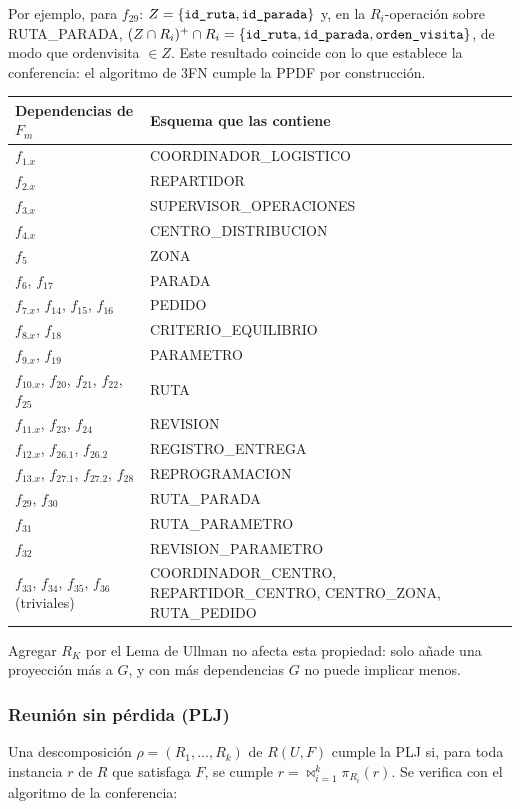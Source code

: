 \documentclass[11pt,a4paper]{article}
\newcommand{\ubrk}{\textunderscore\allowbreak}
\newcommand{\campo}[1]{\textnormal{\ttfamily\let\_\ubrk #1}}
\begin{document}
Por ejemplo, para $f_{29}$: $Z = \{\campo{id\_ruta}, \campo{id\_parada}\}$ y, en la $R_i$-operación sobre RUTA\_PARADA, $(Z \cap R_i)^+ \cap R_i = \{\campo{id\_ruta}, \campo{id\_parada}, \campo{orden\_visita}\}$, de modo que \campo{orden\_visita} $\in Z$. Este resultado coincide con lo que establece la conferencia: el algoritmo de 3FN cumple la PPDF por construcción.

{\small
\begin{longtable}{P{0.45\textwidth}P{0.45\textwidth}}
\toprule
\textbf{Dependencias de $F_m$} & \textbf{Esquema que las contiene}\\ \midrule
\endhead
$f_{1.x}$ & COORDINADOR\_LOGISTICO\\
$f_{2.x}$ & REPARTIDOR\\
$f_{3.x}$ & SUPERVISOR\_OPERACIONES\\
$f_{4.x}$ & CENTRO\_DISTRIBUCION\\
$f_5$ & ZONA\\
$f_6$, $f_{17}$ & PARADA\\
$f_{7.x}$, $f_{14}$, $f_{15}$, $f_{16}$ & PEDIDO\\
$f_{8.x}$, $f_{18}$ & CRITERIO\_EQUILIBRIO\\
$f_{9.x}$, $f_{19}$ & PARAMETRO\\
$f_{10.x}$, $f_{20}$, $f_{21}$, $f_{22}$, $f_{25}$ & RUTA\\
$f_{11.x}$, $f_{23}$, $f_{24}$ & REVISION\\
$f_{12.x}$, $f_{26.1}$, $f_{26.2}$ & REGISTRO\_ENTREGA\\
$f_{13.x}$, $f_{27.1}$, $f_{27.2}$, $f_{28}$ & REPROGRAMACION\\
$f_{29}$, $f_{30}$ & RUTA\_PARADA\\
$f_{31}$ & RUTA\_PARAMETRO\\
$f_{32}$ & REVISION\_PARAMETRO\\
$f_{33}$, $f_{34}$, $f_{35}$, $f_{36}$ (triviales) & COORDINADOR\_CENTRO, REPARTIDOR\_CENTRO, CENTRO\_ZONA, RUTA\_PEDIDO\\
\bottomrule
\end{longtable}
}

Agregar $R_K$ por el Lema de Ullman no afecta esta propiedad: solo añade una proyección más a $G$, y con más dependencias $G$ no puede implicar menos.

\subsubsection*{Reunión sin pérdida (PLJ)}
Una descomposición $\rho = (R_1, \dots, R_k)$ de $R(U, F)$ cumple la PLJ si, para toda instancia $r$ de $R$ que satisfaga $F$, se cumple $r = \bowtie_{i=1}^{k} \pi_{R_i}(r)$. Se verifica con el algoritmo de la conferencia:
\end{document}
